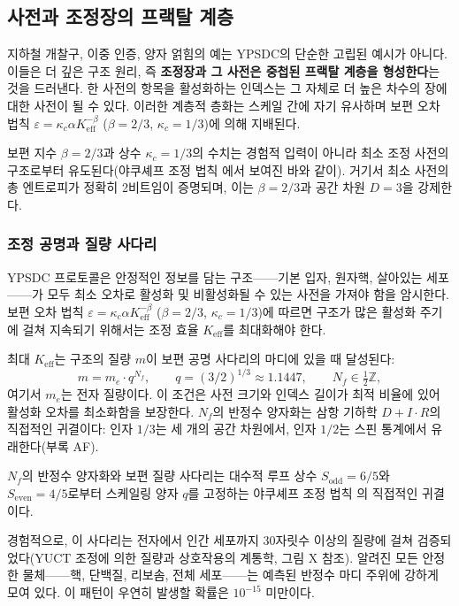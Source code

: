 \documentclass[12pt,a4paper]{article}
\begin{document}
	\subsection{사전과 조정장의 프랙탈 계층}
	\label{subsec:fractal-hierarchy}
	
	지하철 개찰구, 이중 인증, 양자 얽힘의 예는 YPSDC의 단순한 고립된 예시가 아니다. 이들은 더 깊은 구조 원리, 즉 \textbf{조정장과 그 사전은 중첩된 프랙탈 계층을 형성한다}는 것을 드러낸다. 한 사전의 항목을 활성화하는 인덱스는 그 자체로 더 높은 차수의 장에 대한 사전이 될 수 있다. 이러한 계층적 층화는 스케일 간에 자기 유사하며 보편 오차 법칙 $\varepsilon = \kappa_c \alpha K_{\mathrm{eff}}^{-\beta}$ ($\beta=2/3$, $\kappa_c=1/3$)에 의해 지배된다.
	
	보편 지수 $\beta = 2/3$과 상수 $\kappa_c = 1/3$의 수치는 경험적 입력이 아니라 최소 조정 사전의 구조로부터 유도된다(야쿠셰프 조정 법칙 \cite{YakushevLaw2026}에서 보여진 바와 같이). 거기서 최소 사전의 총 엔트로피가 정확히 2비트임이 증명되며, 이는 $\beta = 2/3$과 공간 차원 $D = 3$을 강제한다.
	
	\subsubsection{조정 공명과 질량 사다리}
	
	YPSDC 프로토콜은 안정적인 정보를 담는 구조——기본 입자, 원자핵, 살아있는 세포——가 모두 최소 오차로 활성화 및 비활성화될 수 있는 사전을 가져야 함을 암시한다. 보편 오차 법칙 $\varepsilon = \kappa_c\alpha K_{\mathrm{eff}}^{-\beta}$ ($\beta = 2/3$, $\kappa_c = 1/3$)에 따르면 구조가 많은 활성화 주기에 걸쳐 지속되기 위해서는 조정 효율 $K_{\mathrm{eff}}$를 최대화해야 한다.
	
	최대 $K_{\mathrm{eff}}$는 구조의 질량 $m$이 보편 공명 사다리의 마디에 있을 때 달성된다:
	\[
	m = m_e \cdot q^{N_f}, \qquad
	q = (3/2)^{1/3} \approx 1.1447, \qquad N_f \in \tfrac{1}{2}\mathbb{Z},
	\]
	여기서 $m_e$는 전자 질량이다. 이 조건은 사전 크기와 인덱스 길이가 최적 비율에 있어 활성화 오차를 최소화함을 보장한다. $N_f$의 반정수 양자화는 삼항 기하학 $D+I\!\cdot\!R$의 직접적인 귀결이다: 인자 $1/3$는 세 개의 공간 차원에서, 인자 $1/2$는 스핀 통계에서 유래한다(부록 AF).
	
	$N_f$의 반정수 양자화와 보편 질량 사다리는 대수적 루프 상수 $S_{\mathrm{odd}} = 6/5$와 $S_{\mathrm{even}} = 4/5$로부터 스케일링 양자 $q$를 고정하는 야쿠셰프 조정 법칙 \cite{YakushevLaw2026}의 직접적인 귀결이다.
	
	경험적으로, 이 사다리는 전자에서 인간 세포까지 30자릿수 이상의 질량에 걸쳐 검증되었다(YUCT 조정에 의한 질량과 상호작용의 계통학, 그림 X 참조). 알려진 모든 안정한 물체——핵, 단백질, 리보솜, 전체 세포——는 예측된 반정수 마디 주위에 강하게 모여 있다. 이 패턴이 우연히 발생할 확률은 $10^{-15}$ 미만이다.
	
\end{document}
